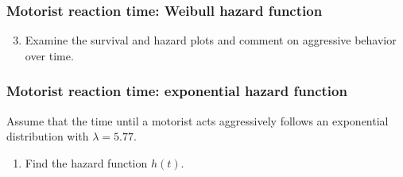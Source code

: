 \begin{frame}
\frametitle{Motorist reaction time: Weibull hazard function}
\begin{enumerate}
\setcounter{enumi}{2}
\item Examine the survival and hazard plots and comment on aggressive behavior over time.
\end{enumerate}
\vskip150pt
\end{frame}

\begin{frame}
\frametitle{Motorist reaction time: exponential hazard function}
Assume that the time until a motorist acts aggressively follows an exponential distribution with $\lambda=5.77$.
\begin{enumerate}
\item Find the hazard function $h(t)$.
\end{enumerate}
\vskip150pt
\end{frame}

